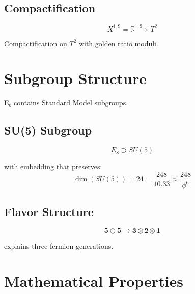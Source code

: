 \subsection{Compactification}

\begin{equation}
X^{1,9} = \mathbb{R}^{1,9} \times T^2
\end{equation}

\begin{proposition}
\label{prop:compactification}
Compactification on $T^2$ with golden ratio moduli.
\end{proposition}

\section{Subgroup Structure}

E₈ contains Standard Model subgroups.

\subsection{SU(5) Subgroup}

\begin{theorem}[E₈ → SU(5)]
\label{thm:e8-su5}
\begin{equation}
E_8 \supset SU(5)
\end{equation}

with embedding that preserves:
\begin{equation}
\dim(SU(5)) = 24 = \frac{248}{10.33} \approx \frac{248}{\phi^6}
\end{equation}
\end{theorem}

\subsection{Flavor Structure}

\begin{proposition}
\label{prop:generation}
\begin{equation}
\mathbf{5} \oplus \mathbf{5} \to \mathbf{3} \otimes \mathbf{2} \otimes \mathbf{1}
\end{equation}

explains three fermion generations.
\end{proposition}

\section{Mathematical Properties}

